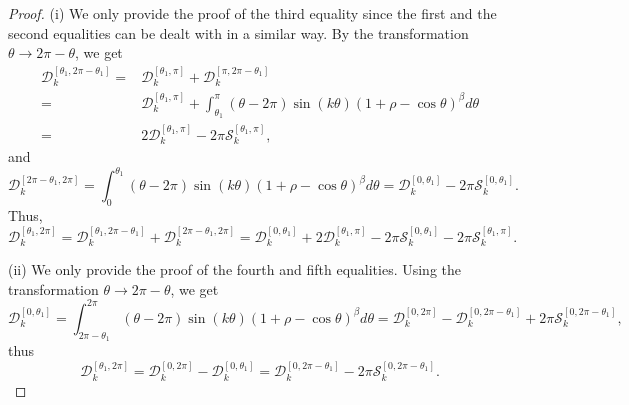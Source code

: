 \documentclass[11pt]{amsart}
\theoremstyle{remark}
\theoremstyle{definition}
\begin{document}
\begin{proof} (i)
We only provide the proof of the third equality since the first and the second equalities can be dealt with in a similar way. By the transformation $\theta \to 2\pi-\theta$, we get
\begin{equation*} \label{relaprooeq1}
\begin{split}
\mathcal{D}_{k}^{\left[\theta_{1},2\pi-\theta_1\right]}=&\mathcal{D}_{k}^{\left[\theta_{1},\pi\right]}+\mathcal{D}_{k}^{\left[\pi,2\pi-\theta_1\right]}\\
=&\mathcal{D}_{k}^{\left[\theta_{1},\pi\right]}+\int_{\theta_1}^{\pi}(\theta-2\pi)\sin(k\theta)\left(1+\rho-\cos\theta\right)^{\beta}d\theta\\
=&2\mathcal{D}_{k}^{\left[\theta_{1},\pi\right]}-2\pi\mathcal{S}_{k}^{\left[\theta_{1},\pi\right]},
\end{split}
\end{equation*}
and
\begin{equation*}
\mathcal{D}_{k}^{\left[2\pi-\theta_{1},2\pi\right]}=\int_0^{\theta_1}(\theta-2\pi)\sin(k\theta)\left(1+\rho-\cos\theta\right)^{\beta}d\theta=\mathcal{D}_{k}^{\left[0,\theta_{1}\right]}-2\pi\mathcal{S}_{k}^{\left[0,\theta_{1}\right]}.
\end{equation*}
Thus, $$\mathcal{D}_{k}^{\left[\theta_{1},2\pi\right]}=\mathcal{D}_{k}^{\left[\theta_{1},2\pi-\theta_1\right]}+\mathcal{D}_{k}^{\left[2\pi-\theta_{1},2\pi\right]}
=\mathcal{D}_{k}^{\left[0,\theta_{1}\right]}+2\mathcal{D}_{k}^{\left[\theta_{1},\pi\right]}-2\pi\mathcal{S}_{k}^{\left[0,\theta_{1}\right]}-2\pi\mathcal{S}_{k}^{\left[\theta_{1},\pi\right]}.$$



 (ii)
We only provide the proof of the   fourth and fifth  equalities. Using  the transformation $\theta \to 2\pi-\theta$, we get
\begin{equation*} \label{relaprooeq2}
\mathcal{D}_{k}^{\left[0,\theta_{1}\right]}=\int_{2\pi-\theta_1}^{2\pi}(\theta-2\pi)\sin(k\theta)\left(1+\rho-\cos\theta\right)^{\beta}d\theta=\mathcal{D}_{k}^{\left[0,2\pi\right]}-\mathcal{D}_{k}^{\left[0,2\pi-\theta_{1}\right]}+2\pi\mathcal{S}_{k}^{\left[0,2\pi-\theta_{1}\right]},
\end{equation*}
thus \begin{equation*}
\mathcal{D}_{k}^{\left[\theta_{1}, 2\pi\right]}=\mathcal{D}_{k}^{\left[0,2\pi\right]}-\mathcal{D}_{k}^{\left[0,\theta_{1}\right]}=\mathcal{D}_{k}^{\left[0,2\pi-\theta_{1}\right]}-2\pi\mathcal{S}_{k}^{\left[0,2\pi-\theta_{1}\right]}.
\end{equation*}


\end{proof}
\end{document}
